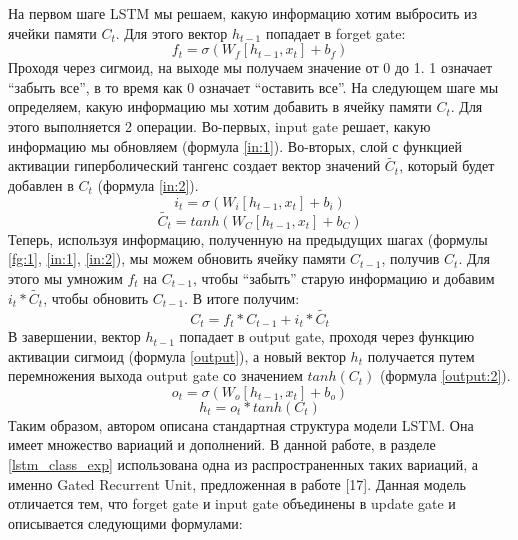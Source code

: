     На первом шаге LSTM мы решаем, какую информацию хотим выбросить из ячейки памяти $C_{t}$. Для этого вектор $h_{t-1}$ попадает в forget gate:
    \begin{equation}\label{fg:1}
    f_{t} = \sigma(W_{f}[h_{t-1},x_{t}]+b_{f})
    \end{equation}
    Проходя через сигмоид, на выходе мы получаем значение от 0 до 1. 1 означает ``забыть все'', в то время как 0 означает ``оставить все''.
    На следующем шаге мы определяем, какую информацию мы хотим добавить в ячейку памяти $C_{t}$. Для этого выполняется 2 операции. Во-первых, input gate решает, какую информацию мы обновляем (формула \ref{in:1}). Во-вторых, слой с функцией активации гиперболический тангенс создает вектор значений $\tilde{C_{t}}$, который будет добавлен в $C_{t}$ (формула \ref{in:2}).
    \begin{equation}\label{in:1}
    i_{t}=\sigma(W_{i}[h_{t-1},x_{t}]+b_{i})
    \end{equation}
    \begin{equation}\label{in:2}
    \tilde{C_{t}} = tanh(W_{C}[h_{t-1},x_{t}]+b_{C})
    \end{equation}
    Теперь, используя информацию, полученную на предыдущих шагах (формулы \ref{fg:1}, \ref{in:1}, \ref{in:2}), мы можем обновить ячейку памяти $C_{t-1}$, получив $C_{t}$. Для этого мы умножим $f_{t}$ на $C_{t-1}$, чтобы ``забыть'' старую информацию и добавим $i_{t}*\tilde{C_{t}}$, чтобы обновить $C_{t-1}$. В итоге получим:
    \begin{equation}\label{update}
    C_{t}=f_{t}*C_{t-1}+i_{t}*\tilde{C_{t}}
    \end{equation}
    В завершении, вектор $h_{t-1}$ попадает в output gate, проходя через функцию активации сигмоид (формула \ref{output}), а новый вектор $h_{t}$ получается путем перемножения выхода output gate со значением $tanh(C_{t})$ (формула \ref{output:2}).
    \begin{equation}\label{output}
    o_{t}=\sigma(W_{o}[h_{t-1},x_{t}]+b_{o})
    \end{equation}
    \begin{equation}\label{output:2}
    h_{t}=o_{t}*tanh(C_{t})
    \end{equation}
    Таким образом, автором описана стандартная структура модели LSTM. Она имеет множество вариаций и дополнений. В данной работе, в разделе \ref{lstm_class_exp} использована одна из распространенных таких вариаций, а именно Gated Recurrent Unit, предложенная в работе [17]. Данная модель отличается тем, что forget gate и input gate объединены в update gate и описывается следующими формулами:
